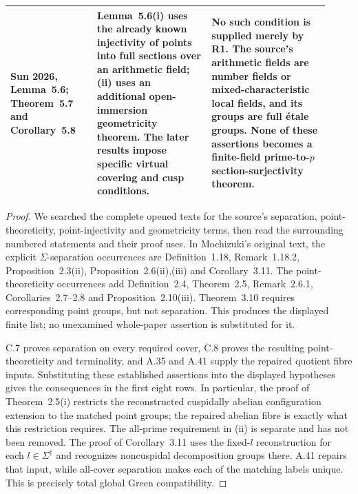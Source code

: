 \documentclass[11pt,a4paper]{article}
\begin{document}
\begin{center}
\begin{longtable}{p{0.25\linewidth}p{0.33\linewidth}p{0.34\linewidth}}
Sun 2026, Lemma~5.6; Theorem~5.7 and Corollary~5.8&
Lemma~5.6(i) uses the already known injectivity of points into
full sections over an arithmetic field; (ii) uses an additional
open-immersion geometricity theorem. The later results impose
specific virtual covering and cusp conditions.&
No such condition is supplied merely by R1. The source's
arithmetic fields are number fields or mixed-characteristic
local fields, and its groups are full \'etale groups.
None of these assertions becomes a finite-field prime-to-$p$
section-surjectivity theorem.\\
\bottomrule
\end{longtable}
\end{center}
\begin{proof}
We searched the complete opened texts for the source's
separation, point-theoreticity, point-injectivity and geometricity
terms, then read the surrounding numbered statements and their
proof uses. In Mochizuki's original text, the explicit
$\Sigma$-separation occurrences are Definition~1.18,
Remark~1.18.2, Proposition~2.3(ii), Proposition~2.6(ii),(iii)
and Corollary~3.11. The point-theoreticity occurrences add
Definition~2.4, Theorem~2.5, Remark~2.6.1, Corollaries~2.7--2.8
and Proposition~2.10(iii). Theorem~3.10 requires corresponding
point groups, but not separation. This produces the displayed
finite list; no unexamined whole-paper assertion is substituted
for it.

C.7 proves separation on every required cover, C.8 proves
the resulting point-theoreticity and terminality, and A.35
and A.41 supply the repaired quotient fibre inputs. Substituting
these established assertions into the displayed hypotheses gives
the consequences in the first eight rows. In particular, the
proof of Theorem~2.5(i) restricts the reconstructed cuspidally
abelian configuration extension to the matched point groups;
the repaired abelian fibre is exactly what this restriction
requires. The all-prime requirement in (ii) is separate and
has not been removed. The proof of Corollary~3.11 uses the
fixed-$l$ reconstruction for each $l\in\Sigma^\dagger$
and recognizes noncuspidal decomposition groups there. A.41
repairs that input, while all-cover separation makes each of
the matching labels unique. This is precisely total global
Green compatibility.


\end{proof}
\end{document}
